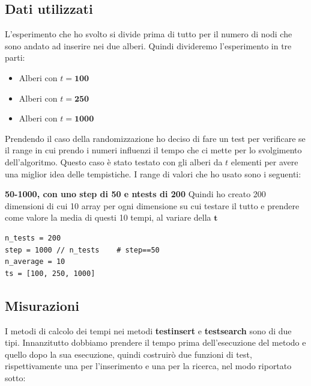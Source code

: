 \subsection{Dati utilizzati}
\label{sec:DatiUtilizzati_1}
L'esperimento che ho svolto si divide prima di tutto per il numero di nodi che sono andato ad inserire nei due alberi. Quindi divideremo l'esperimento in tre parti:

\begin{itemize}
    \item Alberi con $t=\textbf{100}$
    \item Alberi con $t=\textbf{250}$
    \item Alberi con $t=\textbf{1000}$
\end{itemize}

Prendendo il caso della randomizzazione ho deciso di fare un test per verificare se il range in cui prendo i numeri influenzi il tempo che ci mette per lo svolgimento dell'algoritmo. Questo caso è stato testato con gli alberi da $t$ elementi per avere una miglior idea delle tempistiche. I range di valori che ho usato sono i seguenti:

\textbf{50-1000, con uno step di 50 e n\textunderscore tests di 200}
Quindi ho creato 200 dimensioni di cui 10 array per ogni dimensione su cui testare il tutto e prendere come valore la media di questi 10 tempi, al variare della $\textbf{t}$

\begin{verbatim}
n_tests = 200
step = 1000 // n_tests    # step==50
n_average = 10
ts = [100, 250, 1000]
\end{verbatim}

\subsection{Misurazioni}
\label{sec:Misurazioni_1}
I metodi di calcolo dei tempi nei metodi \textbf{test\textunderscore insert} e \textbf{test\textunderscore search} sono di due tipi. Innanzitutto dobbiamo prendere il tempo prima dell'esecuzione del metodo e quello dopo la sua esecuzione, quindi costruirò due funzioni di test, rispettivamente una per l'inserimento e una per la ricerca, nel modo riportato sotto:

